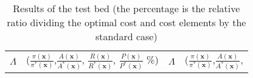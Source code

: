 \documentclass[preprint,12pt]{elsarticle}
\begin{document}
\begin{appendices}
\begin{table}[htbp]
\footnotesize
  \centering
  \caption{Results of the test bed (the percentage is the relative ratio dividing the optimal cost and cost elements by the standard case)}
    \begin{tabular}{llll}
    \toprule
    $\Lambda$ & ($\frac{\pi({\boldsymbol{x}})}{\pi^{*}({\boldsymbol{x}})}$,$\frac{A(\boldsymbol{x})}{A^{*}(\boldsymbol{x})}$,
    $\frac{R(\boldsymbol{x})}{R^{*}(\boldsymbol{x})}$, $\frac{P(\boldsymbol{x})}{P^{*}(\boldsymbol{x})}$ \%)    & $\Lambda$ & ($\frac{\pi({\boldsymbol{x}})}{\pi^{*}({\boldsymbol{x}})}$,$\frac{A(\boldsymbol{x})}{A^{*}(\boldsymbol{x})}$,

\end{tabular}
\end{table}
\end{appendices}
\end{document}
